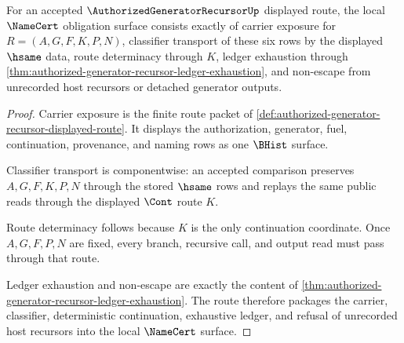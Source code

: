 \begin{theorem}
\label{thm:authorized-generator-recursor-namecert-route}
For an accepted $\AuthorizedGeneratorRecursorUp$ displayed route, the local $\NameCert$ obligation surface consists exactly of carrier exposure for $R=(A,G,F,K,P,N)$, classifier transport of these six rows by the displayed $\hsame$ data, route determinacy through $K$, ledger exhaustion through \autoref{thm:authorized-generator-recursor-ledger-exhaustion}, and non-escape from unrecorded host recursors or detached generator outputs.
\end{theorem}
\begin{proof}
Carrier exposure is the finite route packet of \autoref{def:authorized-generator-recursor-displayed-route}. It displays the authorization, generator, fuel, continuation, provenance, and naming rows as one $\BHist$ surface.

Classifier transport is componentwise: an accepted comparison preserves $A,G,F,K,P,N$ through the stored $\hsame$ rows and replays the same public reads through the displayed $\Cont$ route $K$.

Route determinacy follows because $K$ is the only continuation coordinate. Once $A,G,F,P,N$ are fixed, every branch, recursive call, and output read must pass through that route.

Ledger exhaustion and non-escape are exactly the content of \autoref{thm:authorized-generator-recursor-ledger-exhaustion}. The route therefore packages the carrier, classifier, deterministic continuation, exhaustive ledger, and refusal of unrecorded host recursors into the local $\NameCert$ surface.
\end{proof}

